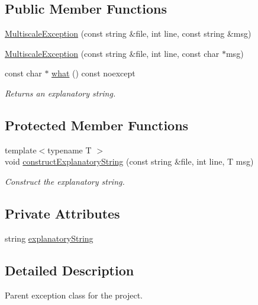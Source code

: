 \subsection*{Public Member Functions}
\begin{DoxyCompactItemize}
\item 
\hyperlink{classmultiscale_1_1MultiscaleException_a6eb7d129f239cc1c4f497b1bbaf94fa5}{Multiscale\-Exception} (const string \&file, int line, const string \&msg)
\item 
\hyperlink{classmultiscale_1_1MultiscaleException_a3c0023538ce22fcd663b98a39b12d5a5}{Multiscale\-Exception} (const string \&file, int line, const char $\ast$msg)
\item 
const char $\ast$ \hyperlink{classmultiscale_1_1MultiscaleException_a71909cca9e9a37254846ad73eb3827d9}{what} () const noexcept
\begin{DoxyCompactList}\small\item\em Returns an explanatory string. \end{DoxyCompactList}\end{DoxyCompactItemize}
\subsection*{Protected Member Functions}
\begin{DoxyCompactItemize}
\item 
{\footnotesize template$<$typename T $>$ }\\void \hyperlink{classmultiscale_1_1MultiscaleException_a294b01073c3974e69114bec9f5f87c0a}{construct\-Explanatory\-String} (const string \&file, int line, T msg)
\begin{DoxyCompactList}\small\item\em Construct the explanatory string. \end{DoxyCompactList}\end{DoxyCompactItemize}
\subsection*{Private Attributes}
\begin{DoxyCompactItemize}
\item 
string \hyperlink{classmultiscale_1_1MultiscaleException_acf3042077605955cbb36a4472ed80233}{explanatory\-String}
\end{DoxyCompactItemize}


\subsection{Detailed Description}
Parent exception class for the project. 

